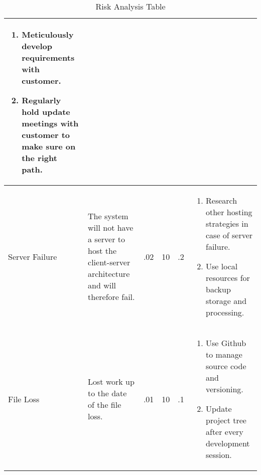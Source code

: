 \begin{table}
\begin{tabular}{|p{7em}|p{7em}|p{5em}|p{4em}|p{4em}|p{11em}|}
\begin{enumerate}
	\item Meticulously develop requirements with customer.
	\item Regularly hold update meetings with customer to make sure on the right path.
\end{enumerate}\\
\hline
Server Failure & The system will not have a server to host the client-server architecture and will therefore fail. & .02 & 10 & .2 & 
 \begin{enumerate}
	\item Research other hosting strategies in case of server failure.
	\item Use local resources for backup storage and processing.
\end{enumerate} \\
\hline
File Loss & Lost work up to the date of the file loss. & .01 & 10 & .1 & 
 \begin{enumerate}
	\item Use Github to manage source code and versioning.
	\item Update project tree after every development session.
\end{enumerate} \\
\hline
\end{tabular}
\caption{Risk Analysis Table}
\label{tab:riskAnalysis}
\end{table}